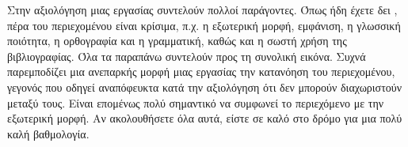Στην αξιολόγηση μιας εργασίας συντελούν πολλοί παράγοντες. Όπως ήδη έχετε δει , πέρα του περιεχομένου είναι κρίσιμα, π.χ. η εξωτερική μορφή, εμφάνιση, η γλωσσική ποιότητα, η ορθογραφία και η γραμματική, καθώς και η σωστή χρήση της βιβλιογραφίας. Όλα τα παραπάνω συντελούν προς τη συνολική εικόνα. Συχνά παρεμποδίζει μια ανεπαρκής μορφή μιας εργασίας την κατανόηση του περιεχομένου, γεγονός που οδηγεί αναπόφευκτα κατά την αξιολόγηση ότι δεν μπορούν διαχωριστούν μεταξύ τους. Είναι επομένως πολύ σημαντικό να συμφωνεί το περιεχόμενο με την εξωτερική μορφή. Αν ακολουθήσετε όλα αυτά, είστε σε καλό στο δρόμο για μια πολύ καλή βαθμολογία.
